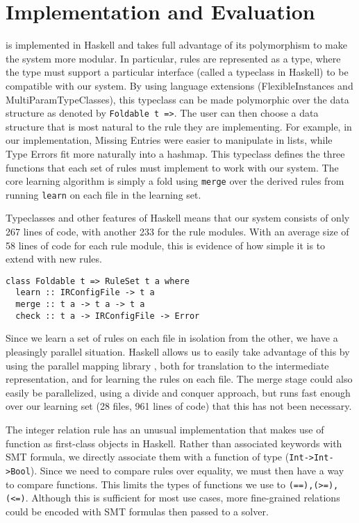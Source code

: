 \section{Implementation and Evaluation}

\app is implemented in Haskell and takes full advantage of its polymorphism to make the system more modular.
In particular, rules are represented as a type, where the type must support a particular interface (called a typeclass in Haskell) to be compatible with our system.
By using language extensions (FlexibleInstances and MultiParamTypeClasses), this typeclass can be made polymorphic over the data structure as denoted by \lstinline{Foldable t =>}.
The user can then choose a data structure that is most natural to the rule they are implementing.
For example, in our implementation, Missing Entries were easier to manipulate in lists, while Type Errors fit more naturally into a hashmap.
This typeclass defines the three functions that each set of rules must implement to work with our system. The core learning algorithm is simply a fold using \lstinline{merge} over the derived rules from running \lstinline{learn} on each file in the learning set.

Typeclasses and other features of Haskell means that our system consists of only 267 lines of code, with another 233 for the rule modules.
With an average size of 58 lines of code for each rule module, this is evidence of how simple it is to extend \app with new rules.

\begin{lstlisting}
class Foldable t => RuleSet t a where
  learn :: IRConfigFile -> t a
  merge :: t a -> t a -> t a
  check :: t a -> IRConfigFile -> Error
\end{lstlisting}

Since we learn a set of rules on each file in isolation from the other, we have a pleasingly parallel situation.
Haskell allows us to easily take advantage of this by using the parallel
mapping library \cite{parallel}, both for translation to the intermediate representation, and for learning the rules on each file.
The merge stage could also easily be parallelized, using a divide and conquer approach, but \app runs fast enough over our learning set (28 files, 961 lines of code) that this has not been necessary.

The integer relation rule has an unusual implementation that makes use of function as first-class objects in Haskell.
Rather than associated keywords with SMT formula, we directly associate them with a function of type (\lstinline{Int->Int->Bool}).
Since we need to compare rules over equality, we must then have a way to compare functions.
This limits the types of functions we use to \lstinline{(==),(>=),(<=)}.
Although this is sufficient for most use cases, more fine-grained relations could be encoded with SMT formulas then passed to a solver.

